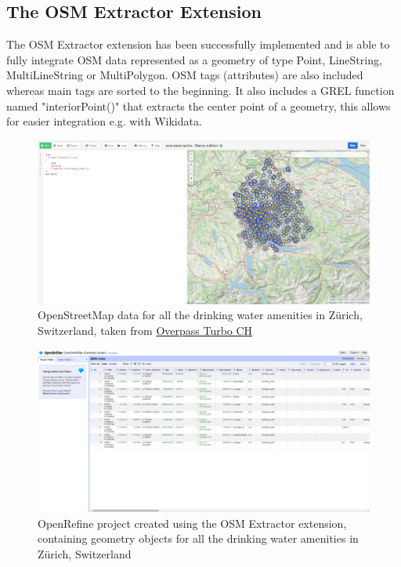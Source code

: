 \subsection*{The OSM Extractor Extension}
The OSM Extractor extension has been
successfully implemented and is able to fully integrate
OSM data represented as a geometry of type Point,
LineString, MultiLineString or MultiPolygon. OSM tags
(attributes) are also included whereas main tags are
sorted to the beginning. It also includes a GREL
function named "interiorPoint()" that extracts the
center point of a geometry, this allows for easier
integration e.g. with
Wikidata.
\begin{figure}[H]
        \includegraphics[width=\textwidth]{./Figures/ManagementSummary/osm_extractor_overpass_query}
        \caption{OpenStreetMap data for all the drinking water amenities in Zürich, Switzerland, taken from \href{http://overpass-turbo.osm.ch/}{Overpass Turbo CH}}
\end{figure}
\begin{figure}[H]
    \includegraphics[width=\textwidth]{./Figures/ManagementSummary/osm_extractor_project}
    \caption{OpenRefine project created using the OSM Extractor extension, containing geometry objects for all the drinking water amenities in Zürich, Switzerland}
\end{figure}
